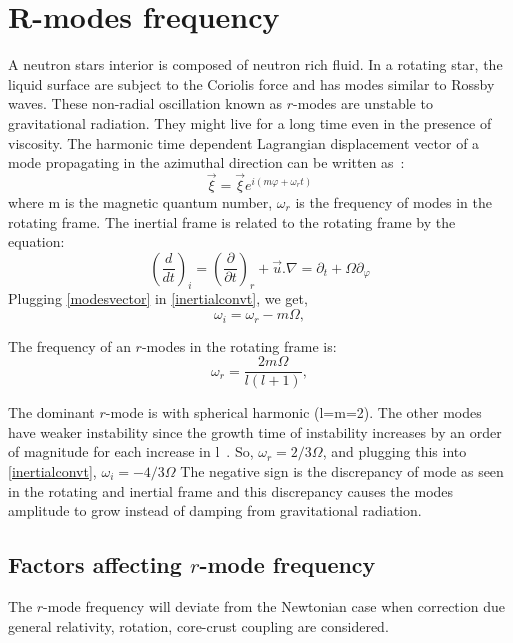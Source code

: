 \documentclass{ttuthes2007}
\begin{document}
\section{R-modes frequency}
A neutron stars interior is composed of neutron rich fluid. In a rotating
star, the liquid surface are subject to the Coriolis force and has modes similar to Rossby
waves. These non-radial oscillation known as $r$-modes are unstable to
gravitational radiation. They might live for a long time even in the presence of
viscosity.
The harmonic time dependent Lagrangian displacement vector of a mode propagating
in the azimuthal
direction can be written as~\cite{ANDERSSON_2001}:
\begin{equation}\label{modesvector}
\vec{\xi}= \vec{\xi} e^{i(m\varphi+\omega_r t)}
\end{equation}
where m is the magnetic quantum number, $\omega_r$ is the frequency of modes in
the rotating frame.
The inertial frame is related to the rotating frame by the equation:
\begin{equation}\label{inertialconvt}
\left(\frac{d}{dt}\right)_i=\left(\frac{\partial}{\partial t}\right)_r+\vec{u}.\nabla=\partial_t+ \Omega
\partial_\varphi
\end{equation}
Plugging \ref{modesvector} in \ref{inertialconvt}, we get,
\begin{equation}
\omega_i=\omega_r - m\Omega,
\end{equation}

The frequency of an $r$-modes in the rotating frame is:
\begin{equation}\label{rotatingframe}
\omega_r = \frac{2m\Omega}{l(l+1)},
\end{equation}

The dominant $r$-mode is with spherical harmonic (l=m=2). The other modes have
weaker instability since the growth time of instability increases by an order of magnitude
for each increase in l~\cite{ANDERSSON_2001}.
So, $\omega_r=2/3\Omega$, and plugging this into \ref{inertialconvt},
$\omega_i = -4/3\Omega$
The negative sign is the discrepancy of mode as seen in the rotating and
inertial frame and this discrepancy causes the modes amplitude to grow instead
of damping from gravitational radiation. 

\subsection{Factors affecting $r$-mode frequency}
The $r$-mode frequency will deviate from the Newtonian case when correction due
general relativity, rotation, core-crust coupling are considered. 
\end{document}
